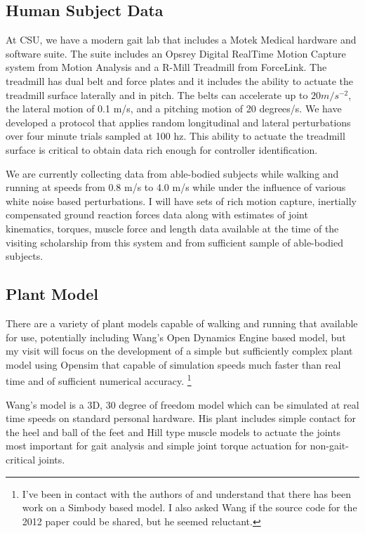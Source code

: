 \documentclass[11pt]{article}
\begin{document}
\subsection*{Human Subject Data}

At CSU, we have a modern gait lab that includes a Motek Medical hardware and
software suite. The suite includes an Opsrey Digital RealTime Motion Capture
system from Motion Analysis and a R-Mill Treadmill from ForceLink. The
treadmill has dual belt and force plates and it includes the ability to actuate
the treadmill surface laterally and in pitch. The belts can accelerate up to
$20 m/s^{-2}$, the lateral motion of 0.1 m/s, and a pitching motion of 20
degrees/s. We have developed a protocol that applies random longitudinal and
lateral perturbations over four minute trials sampled at 100 hz. This ability
to actuate the treadmill surface is critical to obtain data rich enough for
controller identification.


We are currently collecting data from able-bodied subjects while walking and
running at speeds from 0.8 m/s to 4.0 m/s while under the influence of various
white noise based perturbations. I will have sets of rich motion capture,
inertially compensated ground reaction forces data along with estimates of
joint kinematics, torques, muscle force and length data available at the time
of the visiting scholarship from this system and from sufficient sample of
able-bodied subjects.

\subsection*{Plant Model}

There are a variety of plant models capable of walking and running that
available for use, potentially including Wang's Open Dynamics Engine based
model, but my visit will focus on the development of a simple but sufficiently
complex plant model using Opensim that capable of simulation speeds much faster
than real time and of sufficient numerical accuracy. \footnote{I've been in
  contact with the authors of \cite{Wang2012} and understand that there has
been work on a Simbody based model. I also asked Wang if the source code for the
2012 paper could be shared, but he seemed reluctant.}

Wang's model is a 3D, 30 degree of freedom model which can be simulated at real
time speeds on standard personal hardware. His plant includes simple contact
for the heel and ball of the feet and Hill type muscle models to actuate the
joints most important for gait analysis and simple joint torque actuation for
non-gait-critical joints.
\end{document}
